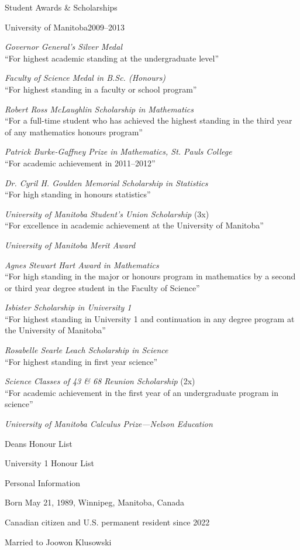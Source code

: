 \documentclass{resume}
\begin{document}
\begin{rSection}{Student Awards \& Scholarships}
\begin{rSubsection}{University of Manitoba}{2009--2013}{}{}
\item \textit{Governor General's Silver Medal} \\ ``For highest academic standing at the undergraduate level''
\item \textit{Faculty of Science Medal in B.Sc. (Honours)} \\ ``For highest standing in a faculty or school program''
\item \textit{Robert Ross McLaughlin Scholarship in Mathematics} \\ ``For a full-time student who has achieved the highest standing in the third year of any mathematics honours program''
\item \textit{Patrick Burke-Gaffney Prize in Mathematics, St. Pauls College} \\ ``For academic achievement in 2011--2012''
\item \textit{Dr. Cyril H. Goulden Memorial Scholarship in Statistics} \\ ``For high standing in honours statistics''
\item \textit{University of Manitoba Student's Union Scholarship} (3x) \\ ``For excellence in academic achievement at the University of Manitoba''
\item \textit{University of Manitoba Merit Award}
\item \textit{Agnes Stewart Hart Award in Mathematics} \\ ``For high standing in the major or honours program in mathematics by a second or third year degree student in the Faculty of Science''
\item \textit{Isbister Scholarship in University 1} \\ ``For highest standing in University 1 and continuation in any degree program at the University of Manitoba''
\item \textit{Rosabelle Searle Leach Scholarship in Science} \\ ``For highest standing in first year science''
\item \textit{Science Classes of 43 \& 68 Reunion Scholarship} (2x) \\
``For academic achievement in the first
year of an undergraduate program in science''
\item \textit{University of Manitoba Calculus Prize---Nelson Education}
\item Deans Honour List
\item University 1 Honour List
\end{rSubsection}
\end{rSection}

\begin{rSection}{Personal Information}
\begin{rSubsection}{}{}{}{}
\item Born May 21, 1989, Winnipeg, Manitoba, Canada
\item Canadian citizen and U.S. permanent resident since 2022
\item Married to Joowon Klusowski
\end{rSubsection}
\end{rSection}
\end{document}
